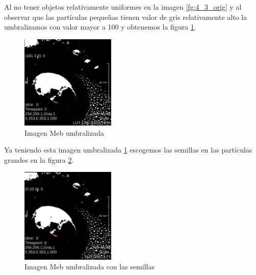 \documentclass{article}
\begin{document}
\begin{par}
Al no tener objetos relativamente uniformes en la imagen \ref{fg:4_3_orig} y al observar que las part\'{i}culas peque\~{u}as tienen valor de gris relativamente alto la umbralizamos con valor mayor a 100 y obtenemos la figura \ref{fg:4_3_umbr}. 
\end{par}

\begin{figure}[ht]
\begin{center}
\includegraphics[width=0.4\textwidth]{4Sintesis/4_3_umbr} %
\caption{Imagen Meb umbralizada}
\label{fg:4_3_umbr}
\end{center}
\end{figure}
\FloatBarrier

\begin{par}
Ya teniendo esta imagen umbralizada \ref{fg:4_3_umbr} escogemos las semillas en las part\'{i}culas grandes en la figura \ref{fg:4_3_seeds}.
\end{par}

\begin{figure}[ht]
\begin{center}
\includegraphics[width=0.4\textwidth]{4Sintesis/4_3_seeds} %
\caption{Imagen Meb umbralizada con las semillas}
\label{fg:4_3_seeds}
\end{center}
\end{figure}
\FloatBarrier
\end{document}
